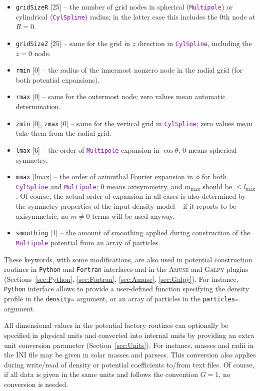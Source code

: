 \documentclass[12pt]{article}
\newcommand{\Amuse}{\textsc{Amuse}\xspace}
\newcommand{\Galpy}{\textsc{Galpy}\xspace}
\newcommand{\Python}{\texttt{Python}\xspace}
\newcommand{\Fortran}{\texttt{Fortran}\xspace}
\newcommand{\ttt}[1]{\textcolor{darkviolet}{\texttt{#1}}}
\newcommand{\ppp}[1]{\textcolor{darkolive} {\texttt{#1}}}
\begin{document}
\begin{itemize}
\item \ppp{gridSizeR} [25] -- the number of grid nodes in spherical (\ttt{Multipole}) or cylindrical (\ttt{CylSpline}) radius; in the latter case this includes the 0th node at $R=0$. 
\item \ppp{gridSizeZ} [25] -- same for the grid in $z$ direction in \ttt{CylSpline}, including the $z=0$ node.
\item \ppp{rmin} [0] -- the radius of the innermost nonzero node in the radial grid (for both potential expansions).
\item \ppp{rmax} [0] -- same for the outermost node; zero values mean automatic determination.
\item \ppp{zmin} [0], \ppp{zmax} [0] -- same for the vertical grid in \ttt{CylSpline}; zero values mean take them from the radial grid.
\item \ppp{lmax} [6] -- the order of \ttt{Multipole} expansion in $\cos\theta$; 0 means spherical symmetry. 
\item \ppp{mmax} [lmax] -- the order of azimuthal Fourier expansion in $\phi$ for both  \ttt{CylSpline} and \ttt{Multipole}; 0 means axisymmetry, and $m_\mathrm{max}$ should be $\le l_\mathrm{max}$. Of course, the actual order of expansion in all cases is also determined by the symmetry properties of the input density model -- if it reports to be axisymmetric, no $m\ne 0$ terms will be used anyway.
\item \ppp{smoothing} [1] -- the amount of smoothing applied during construction of the \ttt{Multipole} potential from an array of particles.
\end{itemize}

These keywords, with some modifications, are also used in potential construction routines in \Python and \Fortran interfaces and in the \Amuse and \Galpy plugins (Sections~\ref{sec:Python}, \ref{sec:Fortran}, \ref{sec:Amuse}, \ref{sec:Galpy}). For instance, \Python interface allows to provide a user-defined function specifying the density profile in the \ppp{density=} argument, or an array of particles in the \ppp{particles=} argument.

All dimensional values in the potential factory routines can optionally be specified in physical units and converted into internal units by providing an extra unit conversion parameter (Section~\ref{sec:Units}). For instance, masses and radii in the INI file may be given in solar masses and parsecs. This conversion also applies during write/read of density or potential coefficients to/from text files. Of course, if all data is given in the same units and follows the convention $G=1$, no conversion is needed.
\end{document}
